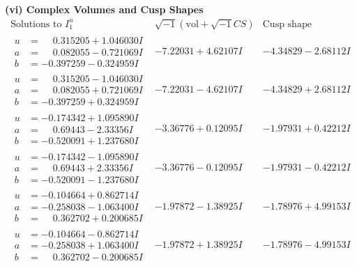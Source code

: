 \documentclass[1p]{elsarticle_modified}
\theoremstyle{definition}
\newcommand{\I}{\sqrt{-1}}
\begin{document}
\newpage\flushleft \textbf{(vi) Complex Volumes and Cusp Shapes}
$$\begin{array}{c|c|c}  
\text{Solutions to }I^u_{1}& \I (\text{vol} + \sqrt{-1}CS) & \text{Cusp shape}\\
 \hline 
\begin{aligned}
u &= \phantom{-}0.315205 + 1.046030 I \\
a &= \phantom{-}0.082055 - 0.721069 I \\
b &= -0.397259 - 0.324959 I\end{aligned}
 & -7.22031 + 4.62107 I & -4.34829 - 2.68112 I \\ \hline\begin{aligned}
u &= \phantom{-}0.315205 - 1.046030 I \\
a &= \phantom{-}0.082055 + 0.721069 I \\
b &= -0.397259 + 0.324959 I\end{aligned}
 & -7.22031 - 4.62107 I & -4.34829 + 2.68112 I \\ \hline\begin{aligned}
u &= -0.174342 + 1.095890 I \\
a &= \phantom{-}0.69443 - 2.33356 I \\
b &= -0.520091 + 1.237680 I\end{aligned}
 & -3.36776 + 0.12095 I & -1.97931 + 0.42212 I \\ \hline\begin{aligned}
u &= -0.174342 - 1.095890 I \\
a &= \phantom{-}0.69443 + 2.33356 I \\
b &= -0.520091 - 1.237680 I\end{aligned}
 & -3.36776 - 0.12095 I & -1.97931 - 0.42212 I \\ \hline\begin{aligned}
u &= -0.104664 + 0.862714 I \\
a &= -0.258038 - 1.063400 I \\
b &= \phantom{-}0.362702 + 0.200685 I\end{aligned}
 & -1.97872 - 1.38925 I & -1.78976 + 4.99153 I \\ \hline\begin{aligned}
u &= -0.104664 - 0.862714 I \\
a &= -0.258038 + 1.063400 I \\
b &= \phantom{-}0.362702 - 0.200685 I\end{aligned}
 & -1.97872 + 1.38925 I & -1.78976 - 4.99153 I \\ \hline\begin{aligned}

\end{aligned}
\end{array}$$
\end{document}

